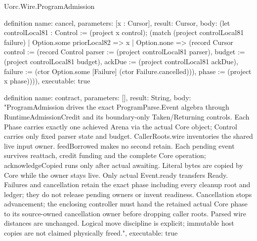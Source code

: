 \begin{lexlean}{Uorc.Wire.ProgramAdmission}
\begin{semanticmodule}
definition{
  name: cancel,
  parameters: [x : Cursor],
  result: Cursor,
  body: (let controlLocal81 : Control := (project x control); (match (project controlLocal81 failure)
    | Option.some priorLocal82 => x
    | Option.none => (record Cursor {control := (record Control {parser := (project controlLocal81 parser), budget := (project controlLocal81 budget), ackDue := (project controlLocal81 ackDue), failure := (ctor Option.some [Failure] (ctor Failure.cancelled))}), phase := (project x phase)}))),
  executable: true
}

definition{
  name: contract,
  parameters: [],
  result: String,
  body: "ProgramAdmission drives the exact ProgramParse.Event algebra through RuntimeAdmissionCredit and its boundary-only Taken/Returning controls. Each Phase carries exactly one achieved Arena via the actual Core object; Control carries only fixed parser state and budget. CallerRoots.wire inventories the shared live input owner. feedBorrowed makes no second retain. Each pending event survives reattach, credit funding and the complete Core operation; acknowledgeCopied runs only after actual awaiting. Literal bytes are copied by Core while the owner stays live. Only actual Event.ready transfers Ready. Failures and cancellation retain the exact phase including every cleanup root and ledger; they do not release pending owners or invent readiness. Cancellation stops advancement; the enclosing controller must hand the retained actual Core phase to its source-owned cancellation owner before dropping caller roots. Parsed wire distances are unchanged. Logical move discipline is explicit; immutable host copies are not claimed physically freed.",
  executable: true
}
\end{semanticmodule}
\end{lexlean}
